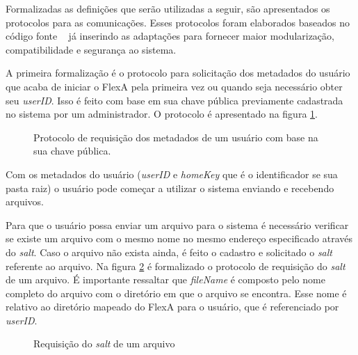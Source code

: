         
        
        Formalizadas as definições que serão utilizadas a seguir, são apresentados os protocolos para as comunicações. Esses protocolos foram elaborados baseados no código fonte ~\cite{mario} já inserindo as adaptações para fornecer maior modularização, compatibilidade e segurança ao sistema.
        

        A primeira formalização é o protocolo para solicitação dos metadados do usuário que acaba de iniciar o FlexA pela primeira vez ou quando seja necessário obter seu \textit{userID}. Isso é feito com base em sua chave pública previamente cadastrada no sistema por um administrador. O protocolo é apresentado na figura \ref{fig:protMetadadosUsuario}.
        
        \begin{figure}[!ht]
        
        
        \caption{Protocolo de requisição dos metadados de um usuário com base na sua chave pública.}
        \label{fig:protMetadadosUsuario}
        \end{figure}
        
        Com os metadados do usuário (\textit{userID} e \textit{homeKey} que é o identificador se sua pasta raiz) o usuário pode começar a utilizar o sistema enviando e recebendo arquivos.
        
        Para que o usuário possa enviar um arquivo para o sistema é necessário verificar se existe um arquivo com o mesmo nome no mesmo endereço especificado através do \textit{salt}. Caso o arquivo não exista ainda, é feito o cadastro e solicitado o \textit{salt} referente ao arquivo. Na figura \ref{fig:protGetSalt} é formalizado o protocolo de requisição do \textit{salt} de um arquivo. É importante ressaltar que \textit{fileName} é composto pelo nome completo do arquivo com o diretório em que o arquivo se encontra. Esse nome é relativo ao diretório mapeado do FlexA para o usuário, que é referenciado por \textit{userID}.

        \begin{figure}[!ht]
        \caption{Requisição do \textit{salt} de um arquivo}
        \label{fig:protGetSalt}
        \end{figure}
        
